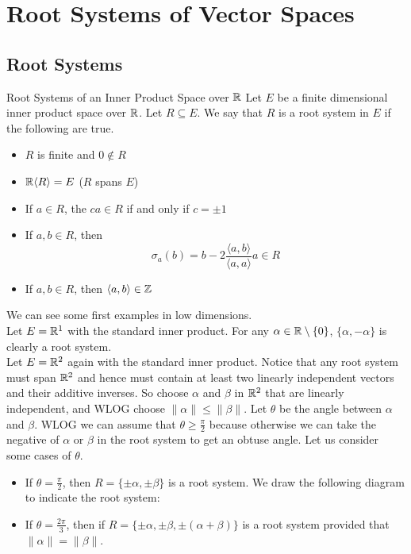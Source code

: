 \documentclass[a4paper]{article}
\begin{document}
\pagebreak
\section{Root Systems of Vector Spaces}
\subsection{Root Systems}
\begin{defn}{Root Systems of an Inner Product Space over $\mathbb{R}$}{} Let $E$ be a finite dimensional inner product space over $\mathbb{R}$. Let $R\subseteq E$. We say that $R$ is a root system in $E$ if the following are true. 
\begin{itemize}
\item $R$ is finite and $0\notin R$
\item $\mathbb{R}\langle R\rangle=E$ ($R$ spans $E$)
\item If $a\in R$, the $ca\in R$ if and only if $c=\pm1$
\item If $a,b\in R$, then $$\sigma_a(b)=b-2\frac{\langle a,b\rangle}{\langle a,a\rangle}a\in R$$
\item If $a,b\in R$, then $\langle a,b\rangle\in\mathbb{Z}$
\end{itemize}
\end{defn}

We can see some first examples in low dimensions. \\

Let $E=\mathbb{R}^1$ with the standard inner product. For any $\alpha\in\mathbb{R}\setminus\{0\}$, $\{\alpha,-\alpha\}$ is clearly a root system. \\

Let $E=\mathbb{R}^2$ again with the standard inner product. Notice that any root system must span $\mathbb{R}^2$ and hence must contain at least two linearly independent vectors and their additive inverses. So choose $\alpha$ and $\beta$ in $\mathbb{R}^2$ that are linearly independent, and WLOG choose $\|\alpha\|\leq\|\beta\|$. Let $\theta$ be the angle between $\alpha$ and $\beta$. WLOG we can assume that $\theta\geq\frac{\pi}{2}$ because otherwise we can take the negative of $\alpha$ or $\beta$ in the root system to get an obtuse angle. Let us consider some cases of $\theta$. 

\begin{itemize}
\item If $\theta=\frac{\pi}{2}$, then $R=\{\pm\alpha,\pm\beta\}$ is a root system. We draw the following diagram to indicate the root system: 
\item If $\theta=\frac{2\pi}{3}$, then if $R=\{\pm\alpha,\pm\beta,\pm(\alpha+\beta)\}$ is a root system provided that $\|\alpha\|=\|\beta\|$. 
\end{itemize}
\end{document}
